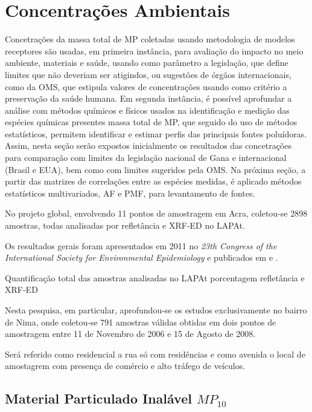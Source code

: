 \section{Concentrações Ambientais}

Concetrações da massa total de MP coletadas usando metodologia de modelos 
receptores são usadas, em primeira instância, para avaliação do impacto no 
meio ambiente, materiais e saúde, usando como parâmetro a legislação, que
define limites que não deveriam ser atigindos, ou sugestões de órgãos
internacionais, como da OMS, que estipula valores de concentrações usando como
critério a preservação da saúde humana. 
Em segunda instância, é possível aprofundar a análise com métodos químicos e 
físicos usados na identificação e medição das espécies químicas presentes massa 
total de MP, que seguido do uso de métodos estatísticos, permitem identificar 
e estimar perfis das principais fontes poluídoras. Assim, 
nesta seção serão expostos inicialmente os resultados das concetrações para 
comparação com limites da legislação nacional de Gana e internacional (Brasil e 
EUA), bem como com limites sugeridos pela OMS. 
Na próxima seção, a partir das matrizes de 
correlações entre as espécies medidas, é aplicado métodos estatísticos 
multivariados, AF e PMF, para levantamento de fontes. 

No projeto global, envolvendo 11 pontos de amostragem em Acra, 
coletou-se 2898 amostras, todas analisadas por refletância e XRF-ED no LAPAt.

Os resultados gerais foram apresentados em 2011 no
\textit{23th Congress of the International Society for Environmental 
Epidemiology} \citep{zhou2011} e publicados em \cite{zhou2013} e \cite{zhou2014}. 

\begin{table}[H]
  \centering
    
  \caption{Quantificação total das amostras analisadas no LAPAt porcentagem
          refletância e XRF-ED}
\end{table}

Nesta pesquisa, em particular, aprofundou-se os estudos exclusivamente no bairro
de Nima, onde coletou-se 791 amostras válidas obtidas em dois pontos de 
amostragem entre 11 de Novembro de 2006 e 15 de Agosto de 2008.

Será referido como residencial a rua só com residências e como avenida 
o local de amostagrem com presença de comércio e alto tráfego de veículos.

\subsection{Material Particulado Inalável $MP_{10}$}

